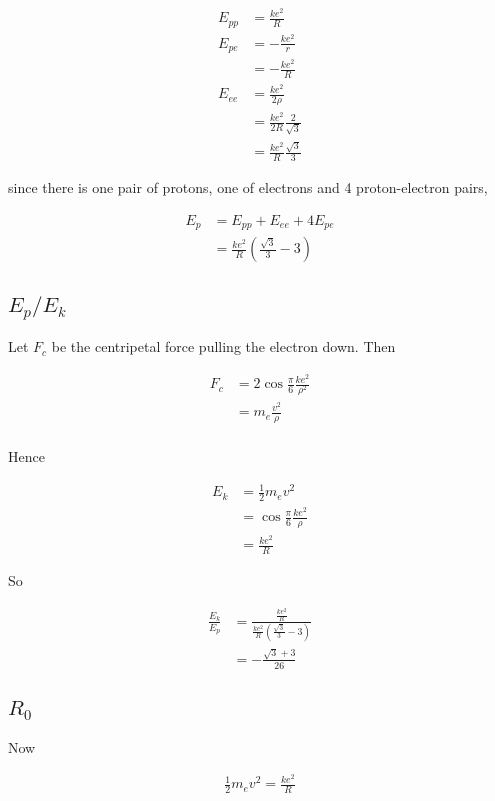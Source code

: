 \documentclass{article}
\begin{document}
\begin{align*}
E_{pp} &= \frac{ke^2}{R} \\
E_{pe} &= -\frac{ke^2}{r} \\
&= -\frac{ke^2}{R} \\
E_{ee} &= \frac{ke^2}{2\rho} \\
&= \frac{ke^2}{2R} \frac{2}{\sqrt 3} \\
&= \frac{ke^2}{R} \frac{\sqrt 3}{3}
\end{align*}

since there is one pair of protons, one of electrons and 4 proton-electron pairs,

\begin{align*}
E_p &= E_{pp} + E_{ee} + 4 E_{pe} \\
&= \frac{ke^2}{R} \left(\frac{\sqrt 3}{3} - 3\right)
\end{align*}

\subsection{$E_p/E_k$}

Let $F_c$ be the centripetal force pulling the electron down. Then

\begin{align*}
F_c &= 2 \cos \frac{\pi}{6} \frac{ke^2}{\rho^2} \\
&= m_e \frac{v^2}{\rho} \\
\end{align*}

Hence

\begin{align*}
E_k &= \frac{1}{2} m_e v^2 \\
&= \cos \frac{\pi}{6} \frac{ke^2}{\rho} \\
&= \frac{ke^2}{R}
\end{align*}

So

\begin{align*}
\frac{E_k}{E_p} &= \frac{\frac{ke^2}{R}}{\frac{ke^2}{R} \left(\frac{\sqrt 3}{3} - 3\right)} \\
&= -\frac{\sqrt 3 + 3}{26}
\end{align*}

\subsection{$R_0$}

Now

\begin{align*}
\frac{1}{2} m_e v^2 = \frac{ke^2}{R}
\end{align*}
\end{document}
